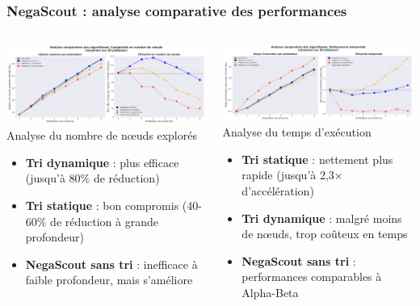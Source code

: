 \documentclass{beamer}
\begin{document}
\begin{frame}
    \frametitle{NegaScout : analyse comparative des performances}
    
    \begin{columns}
        \begin{column}{0.48\textwidth}
            \includegraphics[width=\textwidth]{../assets/analyse_noeuds.png}
            \scriptsize{Analyse du nombre de nœuds explorés}
            
            \begin{itemize}\scriptsize
                \item \textbf{Tri dynamique} : plus efficace (jusqu'à 80\% de réduction)
                \item \textbf{Tri statique} : bon compromis (40-60\% de réduction à grande profondeur)
                \item \textbf{NegaScout sans tri} : inefficace à faible profondeur, mais s'améliore
            \end{itemize}
        \end{column}
        \begin{column}{0.48\textwidth}
            \includegraphics[width=\textwidth]{../assets/analyse_temps.png}
            \scriptsize{Analyse du temps d'exécution}
            
            \begin{itemize}\scriptsize
                \item \textbf{Tri statique} : nettement plus rapide (jusqu'à 2,3× d'accélération)
                \item \textbf{Tri dynamique} : malgré moins de nœuds, trop coûteux en temps
                \item \textbf{NegaScout sans tri} : performances comparables à Alpha-Beta
            \end{itemize}
        \end{column}
    \end{columns}
    

\end{frame}
\end{document}
